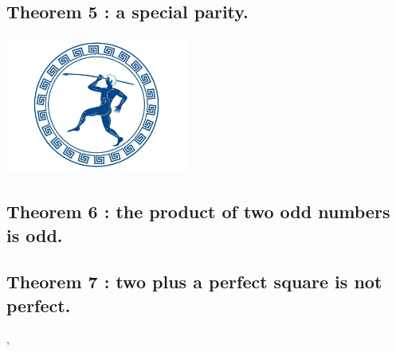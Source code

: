 \documentclass[preview]{standalone}
\begin{document}
\subsection[A special parity.]{\color{section} Theorem 5 \color{black} : a special parity.}

\begin{center}
    \includegraphics[width=6cm]{../resources/jpg/1.6.introduction.to.proofs/olympics.jpg}
\end{center}


\subsection[The product of two odd numbers is odd.]{\color{section} Theorem 6 \color{black} : the product of two odd numbers is odd.}

\pagebreak


\subsection[Two plus a perfect square is not perfect.]{\color{section} Theorem 7 \color{black} : two plus a perfect square is not perfect.}

\vspace{1.5\baselineskip}
\sep
\pagebreak


\end{document}
